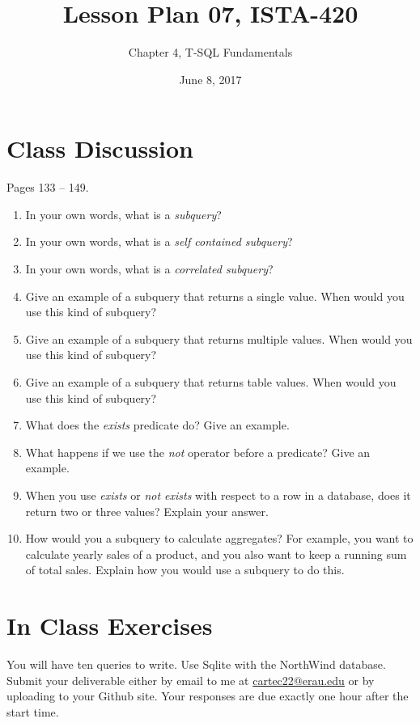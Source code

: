 \documentclass{article}
\title{Lesson Plan 07, ISTA-420}
\author{Chapter 4, T-SQL Fundamentals}
\date{June 8, 2017}
\begin{document}
    

    \maketitle{}

    \section{Class Discussion}

    Pages 133 -- 149.

    \begin{enumerate}
        \item In your own words, what is a \textit{subquery}?
        \item In your own words, what is a \textit{self contained subquery}?
        \item In your own words, what is a \textit{correlated subquery}?
        \item Give an example of a subquery that returns a single value. When would you use this kind of subquery?
        \item Give an example of a subquery that returns multiple values. When would you use this kind of subquery?
        \item Give an example of a subquery that returns table values. When would you use this kind of subquery?
        \item What does the \textit{exists} predicate do? Give an example.
        \item What happens if we use the \textit{not} operator before a predicate? Give an example.
        \item When you use \textit{exists} or \textit{not exists} with respect to a row in a database, does it return two or three values? Explain your answer.
        \item How would you a subquery to calculate aggregates? For example, you want to calculate yearly sales of a product, and you also want to keep a running sum of total sales. Explain how you would use a subquery to do this.
    \end{enumerate}

    \section{In Class Exercises}

    You will have ten queries to write. Use Sqlite with the NorthWind database. Submit your deliverable either by email to me at \url{cartec22@erau.edu} or by uploading to your Github site. Your responses are due exactly one hour after the start time.
\end{document}
